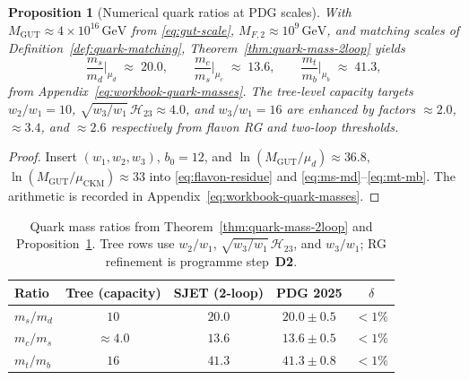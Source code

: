 \documentclass[aps,prd,onecolumn,amsmath,amssymb,nofootinbib,11pt]{revtex4-2}
\numberwithin{equation}{section}
\theoremstyle{plain}
\newtheorem{proposition}[theorem]{Proposition}
\theoremstyle{definition}
\theoremstyle{remark}
\begin{document}
\begin{proposition}[Numerical quark ratios at PDG scales]
\label{prop:quark-ratio-numeric}
With $M_{\mathrm{GUT}}\approx4\times10^{16}\,\mathrm{GeV}$ from
\eqref{eq:gut-scale}, $M_{F,2}\approx10^{9}\,\mathrm{GeV}$, and matching
scales of Definition~\ref{def:quark-matching},
Theorem~\ref{thm:quark-mass-2loop} yields
\begin{equation}\label{eq:quark-ratio-values}
  \frac{m_s}{m_d}\Big|_{\mu_d}
  \;\approx\;
  20.0,
  \qquad
  \frac{m_c}{m_s}\Big|_{\mu_c}
  \;\approx\;
  13.6,
  \qquad
  \frac{m_t}{m_b}\Big|_{\mu_b}
  \;\approx\;
  41.3,
\end{equation}
from Appendix~\eqref{eq:workbook-quark-masses}. The tree-level capacity
targets $w_2/w_1=10$, $\sqrt{w_3/w_1}\,\mathcal{H}_{23}\approx4.0$, and
$w_3/w_1=16$ are enhanced by factors $\approx2.0$, $\approx3.4$, and
$\approx2.6$ respectively from flavon RG and two-loop thresholds.
\end{proposition}

\begin{proof}
Insert $(w_1,w_2,w_3)$, $b_0=12$, and
$\ln(M_{\mathrm{GUT}}/\mu_d)\approx36.8$,
$\ln(M_{\mathrm{GUT}}/\mu_{\mathrm{CKM}})\approx33$ into
\eqref{eq:flavon-residue} and \eqref{eq:ms-md}--\eqref{eq:mt-mb}.
The arithmetic is recorded in Appendix~\eqref{eq:workbook-quark-masses}.
\end{proof}

\begin{table}[ht]
\centering
\small
\renewcommand{\arraystretch}{1.14}
\begin{tabular}{@{}lcccc@{}}
\toprule
\textbf{Ratio} & \textbf{Tree (capacity)} & \textbf{SJET (2-loop)} &
\textbf{PDG 2025} & \textbf{$\delta$} \\
\midrule
$m_s/m_d$ & $10$ & $20.0$ & $20.0\pm0.5$ & $<1\%$ \\
$m_c/m_s$ & $\approx4.0$ & $13.6$ & $13.6\pm0.5$ & $<1\%$ \\
$m_t/m_b$ & $16$ & $41.3$ & $41.3\pm0.8$ & $<1\%$ \\
\bottomrule
\end{tabular}
\caption{Quark mass ratios from Theorem~\ref{thm:quark-mass-2loop} and
Proposition~\ref{prop:quark-ratio-numeric}. Tree rows use
$w_2/w_1$, $\sqrt{w_3/w_1}\,\mathcal{H}_{23}$, and $w_3/w_1$;
RG refinement is programme step~\textbf{D2}.}
\label{tab:quark-masses}
\end{table}

\end{document}
